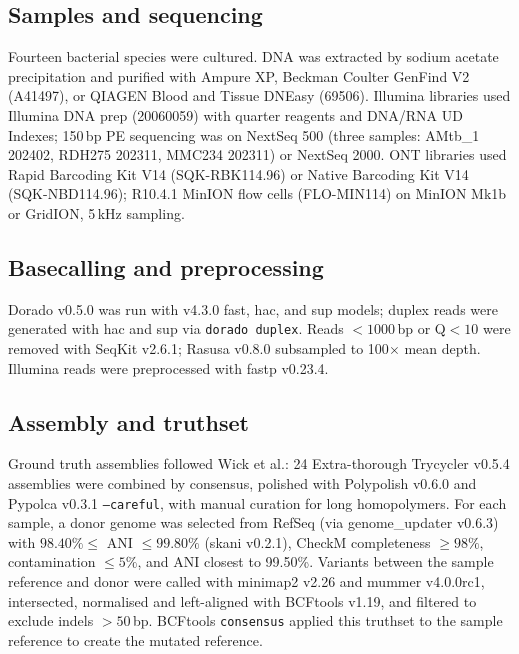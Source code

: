\documentclass[11pt]{article}
\begin{document}
\subsection{Samples and sequencing}
Fourteen bacterial species were cultured. DNA was extracted by sodium acetate precipitation and purified with Ampure XP, Beckman Coulter GenFind V2 (A41497), or QIAGEN Blood and Tissue DNEasy (69506). Illumina libraries used Illumina DNA prep (20060059) with quarter reagents and DNA/RNA UD Indexes; 150\,bp PE sequencing was on NextSeq 500 (three samples: AMtb\_1 202402, RDH275 202311, MMC234 202311) or NextSeq 2000. ONT libraries used Rapid Barcoding Kit V14 (SQK-RBK114.96) or Native Barcoding Kit V14 (SQK-NBD114.96); R10.4.1 MinION flow cells (FLO-MIN114) on MinION Mk1b or GridION, 5\,kHz sampling.

\subsection{Basecalling and preprocessing}
Dorado v0.5.0 was run with v4.3.0 fast, hac, and sup models; duplex reads were generated with hac and sup via \texttt{dorado duplex}. Reads $<1000$\,bp or Q$<10$ were removed with SeqKit v2.6.1; Rasusa v0.8.0 subsampled to 100$\times$ mean depth. Illumina reads were preprocessed with fastp v0.23.4.

\subsection{Assembly and truthset}
Ground truth assemblies followed Wick et al.: 24 Extra-thorough Trycycler v0.5.4 assemblies were combined by consensus, polished with Polypolish v0.6.0 and Pypolca v0.3.1 \texttt{--careful}, with manual curation for long homopolymers. For each sample, a donor genome was selected from RefSeq (via genome\_updater v0.6.3) with $98.40\% \leq$ ANI $\leq 99.80\%$ (skani v0.2.1), CheckM completeness $\geq 98\%$, contamination $\leq 5\%$, and ANI closest to 99.50\%. Variants between the sample reference and donor were called with minimap2 v2.26 and mummer v4.0.0rc1, intersected, normalised and left-aligned with BCFtools v1.19, and filtered to exclude indels $>50$\,bp. BCFtools \texttt{consensus} applied this truthset to the sample reference to create the mutated reference.
\end{document}
